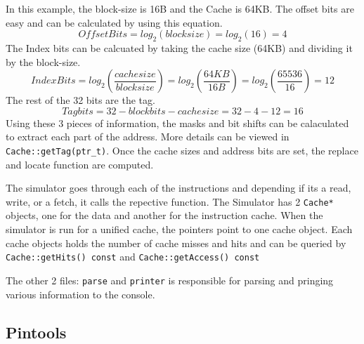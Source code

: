 \documentclass{article}
\begin{document}
			In this example, the block-size is 16B and the Cache is 64KB. The offset bits are easy and can be calculated by using this equation.
			\[ Offset Bits = log_2(blocksize) = log_2(16) = 4  \]
			The Index bits can be calcuated by taking the cache size (64KB) and dividing it by the block-size.
			\[ Index Bits = log_2\left(\frac{cachesize}{blocksize}\right) = log_2\left(\frac{64KB}{16B}\right) = log_2\left(\frac{65536}{16}\right) = 12 \]
			The rest of the 32 bits are the tag.
			\[ Tag bits = 32 - blockbits - cachesize = 32 - 4 - 12 = 16 \]
			Using these 3 pieces of information, the masks and bit shifts can be calaculated to extract each part of the address. More details can be viewed in \verb|Cache::getTag(ptr_t)|. Once the cache sizes and address bits are set, the replace and locate function are computed.
			\par
			The simulator goes through each of the instructions and depending if its a read, write, or a fetch, it calls the repective function. The Simulator has 2 \verb|Cache*| objects, one for the data and another for the instruction cache. When the simulator is run for a unified cache, the pointers point to one cache object. Each cache objects holds the number of cache misses and hits and can be queried by \verb|Cache::getHits() const| and \verb|Cache::getAccess() const|
			\par
			The other 2 files: \verb|parse| and \verb|printer| is responsible for parsing and pringing various information to the console.

	\subsection{Pintools}
\end{document}
